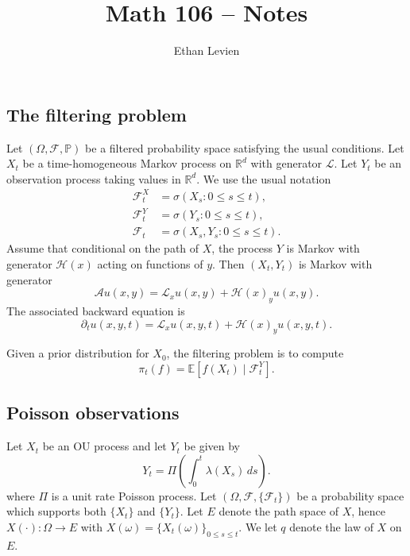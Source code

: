 \documentclass[11pt]{article}
\title{Math 106 -- Notes }
\author{Ethan Levien}
\date{}
\begin{document}
\maketitle


\subsection*{The filtering problem}

Let $(\Omega,\mathcal F,\mathbb P)$ be a filtered probability space satisfying the usual conditions.  
Let $X_t$ be a time-homogeneous Markov process on $\mathbb R^d$ with generator $\mathcal L$.  
Let $Y_t$ be an observation process taking values in $\mathbb R^d$. We use the usual notation 
\begin{align}
\mathcal F_t^X &= \sigma(X_s:0\le s\le t), \\
\mathcal F_t^Y &= \sigma(Y_s:0\le s\le t), \\
\mathcal F_t &= \sigma(X_s,Y_s:0\le s\le t).
\end{align}
Assume that conditional on the path of $X$, the process $Y$ is Markov with generator $\mathcal H(x)$ acting on functions of $y$.  
Then $(X_t,Y_t)$ is Markov with generator
\begin{equation}
\mathcal A u(x,y)
=
\mathcal L_x u(x,y)
+
\mathcal H(x)_y u(x,y).
\end{equation}
The associated backward equation is
\begin{equation}
\partial_t u(x,y,t)
=
\mathcal L_x u(x,y,t)
+
\mathcal H(x)_y u(x,y,t).
\end{equation}

Given a prior distribution for $X_0$, the filtering problem is to compute
\begin{equation}
\pi_t(f)
=
\mathbb E\!\left[f(X_t)\mid \mathcal F_t^Y\right].
\end{equation}

\subsection*{Poisson observations}

Let $X_t$ be an OU process and let $Y_t$ be given by 
\begin{equation}
Y_t = \Pi\!\left(\int_0^t \lambda(X_s)\,ds\right).
\end{equation}
where $\Pi$ is a unit rate Poisson process. Let $(\Omega, {\mathcal F},\{{\mathcal F}_t\})$ be a probability space which supports both $\{X_t\}$ and $\{Y_t\}$. Let $E$ denote the path space of $X$, hence $X(\cdot): \Omega \to E$ with $X(\omega) = \{X_t(\omega)\}_{0 \le s \le t}$. We let $q$ denote the law of $X$ on $E$. 
\end{document}
